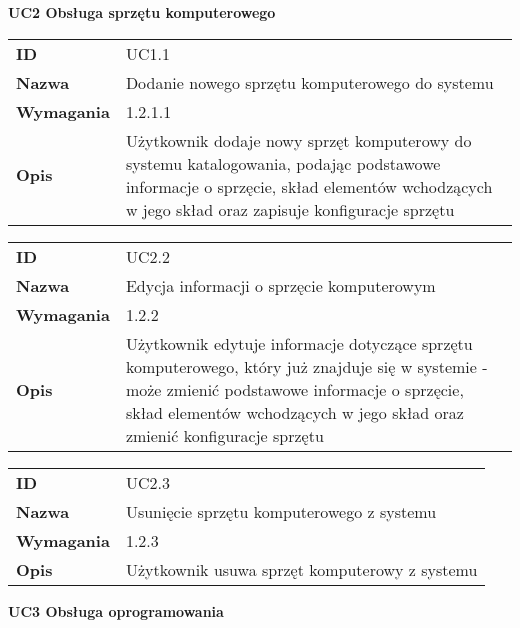 \vspace{.03\textheight}
\begin{center}
  {\Large\bf UC2 Obsługa sprzętu komputerowego} \\
\end{center}
\vspace{.02\textheight}

\begin{tabular}{p{}p{}}
\hfill {\bf ID} & UC1.1 \\
\hfill {\bf Nazwa} & Dodanie nowego sprzętu komputerowego do systemu \\
\hfill {\bf Wymagania} & 1.2.1.1\\
\hfill {\bf Opis} & Użytkownik dodaje nowy sprzęt komputerowy do systemu katalogowania, podając podstawowe informacje o sprzęcie, skład elementów wchodzących w jego skład oraz zapisuje konfiguracje sprzętu \\
\end{tabular}

\vspace{.05\textheight}

\begin{tabular}{p{}p{}}
\hfill {\bf ID} & UC2.2 \\
\hfill {\bf Nazwa} & Edycja informacji o sprzęcie komputerowym \\
\hfill {\bf Wymagania} & 1.2.2 \\
\hfill {\bf Opis} & Użytkownik edytuje informacje dotyczące sprzętu komputerowego, który już znajduje się w systemie - może zmienić podstawowe informacje o sprzęcie, skład elementów wchodzących w jego skład oraz zmienić konfiguracje sprzętu \\
\end{tabular}

\vspace{.05\textheight}

\begin{tabular}{p{}p{}}
\hfill {\bf ID} & UC2.3 \\
\hfill {\bf Nazwa} & Usunięcie sprzętu komputerowego z systemu \\
\hfill {\bf Wymagania} & 1.2.3 \\
\hfill {\bf Opis} & Użytkownik usuwa sprzęt komputerowy z systemu \\
\end{tabular}

\vspace{.03\textheight}
\begin{center}
  {\Large\bf UC3 Obsługa oprogramowania} \\
\end{center}
\vspace{.02\textheight}



